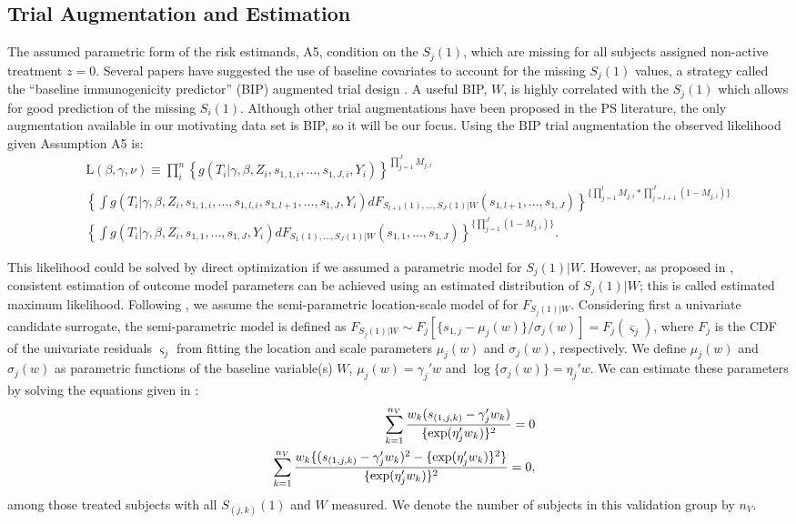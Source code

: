 \documentclass[times, doublespace]{simauth}
\begin{document}
\subsection{Trial Augmentation and Estimation} \label{EST}
The assumed parametric form of the risk estimands, A5, condition on the $S_{j}(1)$, which are missing for all subjects assigned non-active treatment $z=0$. Several papers have suggested the use of baseline covariates to account for the missing $S_{j}(1)$ values, a strategy called the ``baseline immunogenicity predictor'' (BIP) augmented trial design \citep{Follmann06, Gilbert08}. A useful BIP, $W$, is highly correlated with the $S_{j}(1)$ which allows for good prediction of the missing $S_i(1)$. Although other trial augmentations have been proposed in the PS literature, the only augmentation available in our motivating data set is BIP, so it will be our focus. Using the BIP trial augmentation the observed likelihood given Assumption A5 is:
\begin{eqnarray*}
&&\mbox{L}(\beta,\gamma,\nu) \equiv \prod^{n}_i\left\{g(T_i|\gamma, \beta, Z_i, s_{1,1,i},\ldots,s_{1,J,i}, Y_i)\right\}^{\prod_{j=1}^{J}{M_{j,i}}}\\ 
&&\left\{\int g(T_i|\gamma, \beta, Z_i,s_{1,1,i},\ldots, s_{1,l,i}, s_{1,l+1},\ldots, s_{1,J}, Y_i)dF_{S_{l+1}(1),\ldots,S_{J}(1)|W}(s_{1,l+1},\ldots,s_{1,J})\right\}^{\{\prod_{j=1}^{l}{M_{j,i}}*\prod_{j=l+1}^{J}{(1-M_{j,i})}\}}\\ 
&&\left\{\int g(T_i|\gamma, \beta, Z_i,s_{1,1}, \ldots, s_{1,J}, Y_i)dF_{S_{1}(1),\ldots, S_{J}(1)|W}(s_{1,1},\ldots, s_{1,J})\right\}^{\{\prod_{j=1}^{J}{(1-M_{j,i})}\}}.
\end{eqnarray*}

This likelihood could be solved by direct optimization if we assumed a parametric model for $S_j(1)|W$. However, as proposed in \citet{Pepe91}, consistent estimation of outcome model parameters can be achieved using an estimated distribution of $S_j(1)|W$; this is called estimated maximum likelihood. Following \citet{Huang11}, we assume the semi-parametric location-scale model of \citet{Heagerty99} for $F_{S_{j}(1)|W}$. Considering first a univariate candidate surrogate, the semi-parametric model is defined as $F_{S_{j}(1)|W} \sim F_j[\{s_{1,j} -\mu_j(w)\} / \sigma_j(w)]= F_j(\varsigma_j)$, where $F_j$ is the CDF of the univariate residuals $\varsigma_j$ from fitting the location and scale parameters $\mu_j(w)$ and $\sigma_j(w)$, respectively.  We define $\mu_j(w)$ and $\sigma_j(w)$ as parametric functions of the baseline variable(s) $W$, $\mu_j(w) = \gamma_j'w$ and $\log\{\sigma_j(w)\} = \eta_j'w$. We can estimate these parameters by solving the equations given in \citet{Heagerty99}:
\begin{eqnarray}
&&\sum_{k=1}^{n_V} {w_{k} (s_{(1,j,k)} - \gamma_j' w_{k} )\over \{\exp(\eta_j'w_k)\}^2} =0\\ \label{stuff}
&&\sum_{k=1}^{n_V} {w_{k}\{(s_{(1,j,k)} - \gamma_j' w_{k})^2 - \{\exp(\eta_j'w_k)\}^2\} \over \{\exp(\eta_j'w_k)\}^2}=0,\label{stuff2}
\end{eqnarray}
among those treated subjects with all $S_{(j,k)}(1)$ and $W$ measured. We denote the number of subjects in this validation group by $n_V$. 
\end{document}
